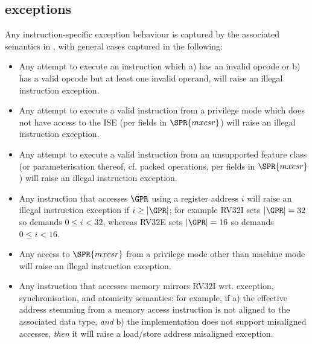 \subsection{\XCID exceptions}
\label{sec:spec:exceptions}


Any instruction-specific exception behaviour is captured by the associated
semantics in , with general cases captured in
the following:

\begin{itemize}
\item Any attempt to execute an \XCID instruction which
      a) has an invalid opcode
         or
      b) has a    valid opcode but at least one invalid operand,
      will raise an 
      illegal instruction exception.
\item Any attempt to execute a
        valid \XCID instruction
      from a privilege mode which does not have access to the ISE
      (per fields in $\SPR{mxcsr}$)
      will raise an
      illegal instruction exception.
\item Any attempt to execute a
        valid \XCID instruction
      from an unsupported feature class (or parameterisation thereof, cf. packed operations, per fields in $\SPR{mxcsr}$)
      will raise an 
      illegal instruction exception.
\item Any instruction that accesses $\GPR$ using a register address $i$ 
      will raise an
      illegal instruction exception
      if $i \geq |\GPR|$; for example
      RV32I sets $|\GPR| = 32$ so demands $0 \leq i < 32$,
      whereas
      RV32E sets $|\GPR| = 16$ so demands $0 \leq i < 16$.
\item Any access to
      $\SPR{mxcsr}$
      from a privilege mode other than machine mode
      will raise an 
      illegal instruction exception.
\item Any instruction that accesses memory mirrors RV32I wrt. exception,
      synchronisation, and atomicity semantics: for example, if
      a) the effective address stemming from a memory access instruction
         is not aligned to the associated data type, 
         {\em  and}
      b) the implementation does not support misaligned accesses,
         {\em then} it 
      will raise a 
      load/store address misaligned exception.
\end{itemize}

